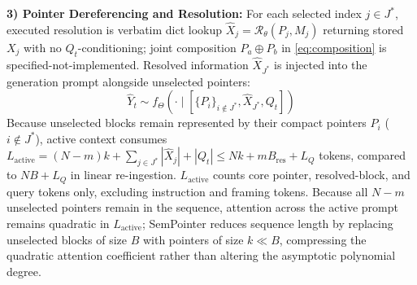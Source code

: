 \documentclass[runningheads]{llncs}
\begin{document}
\noindent\textbf{3) Pointer Dereferencing and Resolution:}
For each selected index $j \in J^*$, executed resolution is verbatim dict lookup $\hat{X}_j = \mathcal{R}_{\theta}(P_j, M_j)$ returning stored $X_j$ with no $Q_t$-conditioning; joint composition $P_a \oplus P_b$ in \eqref{eq:composition} is specified-not-implemented. Resolved information $\hat{X}_{J^*}$ is injected into the generation prompt alongside unselected pointers:
\begin{equation}
\hat{Y}_t \sim f_{\Theta}\left(\cdot \mid [\{P_i\}_{i \notin J^*}, \hat{X}_{J^*}, Q_t]\right)
\end{equation}
Because unselected blocks remain represented by their compact pointers $P_i$ ($i \notin J^*$), active context consumes $L_{\mathrm{active}} = (N - m)k + \sum_{j \in J^*} |\hat{X}_j| + |Q_t| \le Nk + m B_{\mathrm{res}} + L_Q$ tokens, compared to $NB + L_Q$ in linear re-ingestion. $L_{\mathrm{active}}$ counts core pointer, resolved-block, and query tokens only, excluding instruction and framing tokens. Because all $N-m$ unselected pointers remain in the sequence, attention across the active prompt remains quadratic in $L_{\mathrm{active}}$; SemPointer reduces sequence length by replacing unselected blocks of size $B$ with pointers of size $k \ll B$, compressing the quadratic attention coefficient rather than altering the asymptotic polynomial degree.
\end{document}
